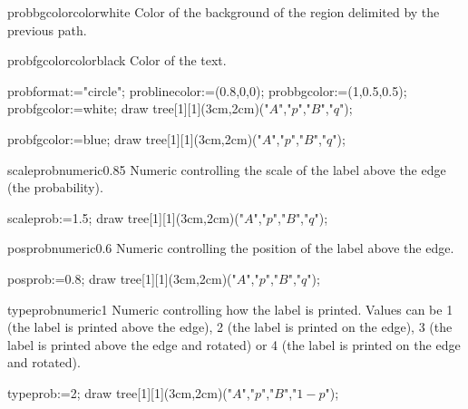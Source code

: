 \documentclass[11pt,a4paper,english]{article}
\begin{document}
\begin{mptparam}{probbgcolor}{color}{white}
Color of the background of the region delimited by the previous path.
\end{mptparam}

\begin{mptparam}{probfgcolor}{color}{black}
Color of the text.
\end{mptparam}


\begin{exemple}[lefthand ratio=0.65]
probformat:="circle";
problinecolor:=(0.8,0,0);
probbgcolor:=(1,0.5,0.5);
probfgcolor:=white;
draw tree[1][1](3cm,2cm)("$A$","$p$","$B$","$q$");
\end{exemple}

\begin{exemple}[lefthand ratio=0.65]
probfgcolor:=blue;
draw tree[1][1](3cm,2cm)("$A$","$p$","$B$","$q$");
\end{exemple}


\begin{mptparam}{scaleprob}{numeric}{0.85}
Numeric controlling the scale of the label above the edge (the probability).
\end{mptparam}

\begin{exemple}[lefthand ratio=0.65]
 scaleprob:=1.5;
 draw tree[1][1](3cm,2cm)("$A$","$p$","$B$","$q$");
\end{exemple}


\begin{mptparam}{posprob}{numeric}{0.6}
Numeric controlling the position of the label above the edge.
\end{mptparam}

\begin{exemple}[lefthand ratio=0.65]
 posprob:=0.8;
 draw tree[1][1](3cm,2cm)("$A$","$p$","$B$","$q$");
\end{exemple}


\begin{mptparam}{typeprob}{numeric}{1}
Numeric controlling how the label is printed. Values can be 1 (the label is printed above the edge), 2 (the label is printed on the edge), 3 (the label is printed above the edge and rotated) or 4 (the label is printed on the edge and rotated).
\end{mptparam}

\begin{exemple}[lefthand ratio=0.7]
 typeprob:=2;
 draw tree[1][1](3cm,2cm)("$A$","$p$","$B$","$1-p$");
\end{exemple}
\end{document}
